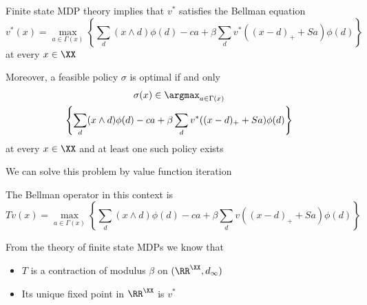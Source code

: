 \begin{frame}
    
    Finite state MDP theory implies that $v^*$ satisfies the Bellman equation
    \begin{equation*}
        v^*(x)
        = \max_{a \in \Gamma(x)} 
        \left\{
            \sum_{d } (x \wedge d)\phi(d)
            - c a
            + \beta
            \sum_{d } v^*((x - d)_+ + Sa) \phi(d)
        \right\}
    \end{equation*}
    at every $x \in \XX$
    
    Moreover, a feasible policy $\sigma$ is optimal if and only 
    \vspace{-1.5em}
    \begin{multline*}
        \sigma(x)
        \in \argmax_{a \in \Gamma(x)}
        \\
        \left\{
            \sum_{d } (x \wedge d) \phi(d)
            - c a
            + \beta
            \sum_{d } v^*((x - d)_+ + Sa) \phi(d)
        \right\}
    \end{multline*}
    at every $x \in \XX$ and at least one such policy exists


\end{frame}


\begin{frame}
    
    We can solve this problem by value function iteration
    
        \vspace{0.5em}
    The Bellman operator in this context is 
    \begin{equation*}
        Tv(x)
        = \max_{a \in \Gamma(x)} \left\{
            \sum_{d } (x \wedge d) \phi(d)
            - c a
            + \beta
            \sum_{d } v((x - d)_+ + Sa) \phi(d)
        \right\}
    \end{equation*}

        \vspace{0.5em}
        \vspace{0.5em}
        \vspace{0.5em}
    From the theory of finite state MDPs we know that 
    \begin{itemize}
        \item $T$ is a contraction of modulus $\beta$ on $(\RR^\XX, d_\infty)$
        \vspace{0.5em}
        \item Its unique fixed point in $\RR^\XX$ is $v^*$
    \end{itemize}
    
    
\end{frame}


